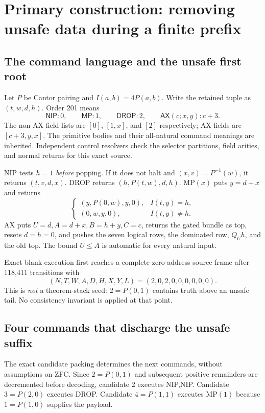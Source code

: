 \section{Primary construction: removing unsafe data during a finite prefix}
\subsection{The command language and the unsafe first root}
Let $P$ be Cantor pairing and $I(a,b)=4P(a,b)$. Write the retained tuple as $(t,w,d,h)$. Order 201 means
\[
\mathsf{NIP}:0,\qquad \mathsf{MP}:1,\qquad
\mathsf{DROP}:2,\qquad \mathsf{AX}(c;x,y):c+3.
\]
The non-AX field lists are $[0]$, $[1,x]$, and $[2]$ respectively; AX fields are $[c+3,y,x]$. The primitive bodies and their all-natural command meanings are inherited. Independent control resolvers check the selector partitions, field arities, and normal returns for this exact source.

NIP tests $h=1$ \emph{before} popping. If it does not halt and $(x,v)=P^{-1}(w)$, it returns $(t,v,d,x)$. DROP returns $(h,P(t,w),d,h)$. MP$(x)$ puts $y=d+x$ and returns
\[
\begin{cases}(y,P(0,w),y,0),&I(t,y)=h,\\(0,w,y,0),&I(t,y)\ne h.\end{cases}
\]
AX puts $U=d,A=d+x,B=h+y,C=c$, returns the gated bundle as top, resets $d=h=0$, and pushes the seven logical rows, the dominated row, $Q_Uh$, and the old top. The bound $U\le A$ is automatic for every natural input.

Exact blank execution first reaches a complete zero-address source frame after 118,411 transitions with
\[
(N,T,W,A,D,H,X,Y,L)=(2,0,2,0,0,0,0,0,0).
\]
This is \emph{not} a theorem-stack seed: $2=P(0,1)$ contains truth above an unsafe tail. No consistency invariant is applied at that point.

\subsection{Four commands that discharge the unsafe suffix}
The exact candidate packing determines the next commands, without assumptions on ZFC. Since $2=P(0,1)$ and subsequent positive remainders are decremented before decoding, candidate 2 executes NIP,NIP. Candidate $3=P(2,0)$ executes DROP. Candidate $4=P(1,1)$ executes MP$(1)$ because $1=P(1,0)$ supplies the payload.

